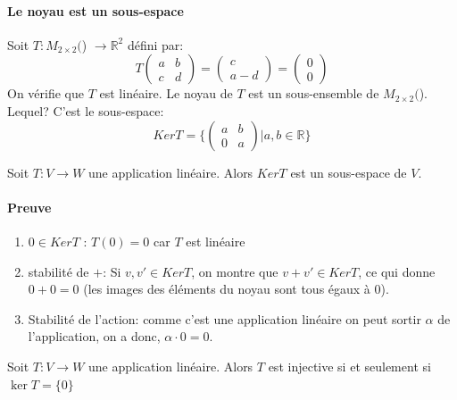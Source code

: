 
\paragraph{Le noyau est un sous-espace}
\begin{exemple}
Soit $T : M_{2\times 2}($\R) $\to \mathbb{R}^2$ défini par:
\[T\begin{pmatrix}
    a & b \\ c & d
\end{pmatrix} = \begin{pmatrix}
    c \\ a-d
\end{pmatrix} = \begin{pmatrix}
    0 \\ 0
\end{pmatrix}\]
On vérifie que $T$ est linéaire. Le noyau de $T$ est un sous-ensemble de $M_{2\times 2}($\R). Lequel? C'est le sous-espace:
\[Ker T = \{ \begin{pmatrix}
    a & b \\ 0 & a
\end{pmatrix}|a, b \in \mathbb{R}\}\]
\end{exemple}

\begin{theoreme}
    Soit $T: V \to W$ une application linéaire. Alors $KerT$ est un sous-espace de $V$.
\end{theoreme}

\paragraph{Preuve}
\begin{enumerate}
    \item $0 \in Ker T$ : $T(0) = 0$ car $T$ est linéaire
    \item stabilité de $+$: Si $v, v' \in KerT$, on montre que $v+v' \in KerT$, ce qui donne $0 + 0 = 0$ (les images des éléments du noyau sont tous égaux à 0).
    \item Stabilité de l'action: comme c'est une application linéaire on peut sortir $\alpha$ de l'application, on a donc, $\alpha \cdot 0 = 0$.
\end{enumerate}


\begin{definition}
Soit $T : V \to W$ une application linéaire. Alors $T$ est injective si et seulement si $\ker T = \{0\}$ 
\end{definition}

